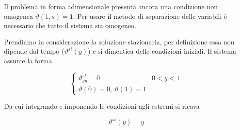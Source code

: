 \documentclass[10pt,a4paper,twoside,openright]{book}
\begin{document}
Il problema in forma adimensionale presenta ancora una condizione non omogenea $\displaystyle \vartheta(1,s) =1$. Per usare il metodo di separazione delle variabili è necessario che tutto il sistema sia omogeneo.

Prendiamo in considerazione la soluzione stazionaria, per definizione essa non dipende dal tempo ($\vartheta^{st}(y)$) e si dimentica delle condizioni iniziali. Il sistema assume la forma

\begin{equation*}
    \begin{cases}
        \vartheta_{yy}^{st} =0            & 0< y< 1 \\
        \vartheta(0) =0,\ \vartheta(1) =1 &
    \end{cases}
\end{equation*}

Da cui integrando e imponendo le condizioni agli estremi si ricava

\begin{equation*}
    \vartheta^{st}(y) =y
\end{equation*}
\end{document}
